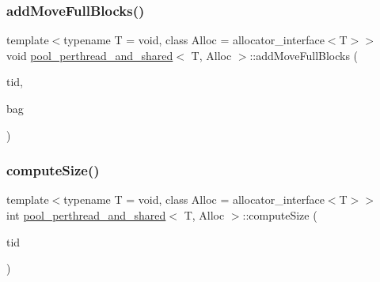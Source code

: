 \subsubsection{\texorpdfstring{add\+Move\+Full\+Blocks()}{addMoveFullBlocks()}\hspace{0.1cm}{\footnotesize\ttfamily [2/2]}}
{\footnotesize\ttfamily template$<$typename T  = void, class Alloc  = allocator\+\_\+interface$<$\+T$>$$>$ \\
void \hyperlink{classpool__perthread__and__shared}{pool\+\_\+perthread\+\_\+and\+\_\+shared}$<$ T, Alloc $>$\+::add\+Move\+Full\+Blocks (\begin{DoxyParamCaption}\item[{const int}]{tid,  }\item[{\hyperlink{classblockbag}{blockbag}$<$ T $>$ $\ast$}]{bag }\end{DoxyParamCaption})\hspace{0.3cm}{\ttfamily [inline]}}

\mbox{\label{classpool__perthread__and__shared_ae394f1c5a151a8c3154b0d94d4164449}} 
\subsubsection{\texorpdfstring{compute\+Size()}{computeSize()}}
{\footnotesize\ttfamily template$<$typename T  = void, class Alloc  = allocator\+\_\+interface$<$\+T$>$$>$ \\
int \hyperlink{classpool__perthread__and__shared}{pool\+\_\+perthread\+\_\+and\+\_\+shared}$<$ T, Alloc $>$\+::compute\+Size (\begin{DoxyParamCaption}\item[{const int}]{tid }\end{DoxyParamCaption})\hspace{0.3cm}{\ttfamily [inline]}}

\mbox{\label{classpool__perthread__and__shared_a31df0438be41883ffcc4addfb6686579}} 
